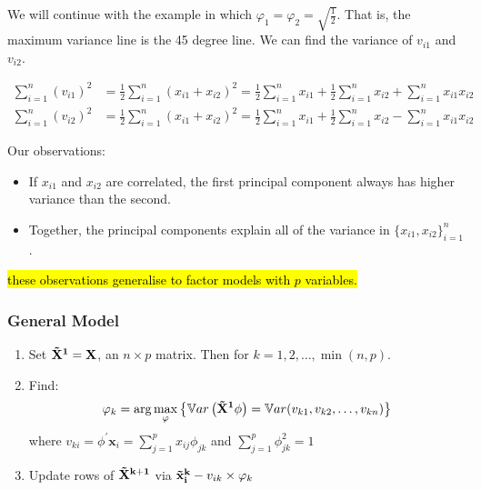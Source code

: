 \documentclass[11pt]{article}
\begin{document}
We will continue with the example in which $\varphi_1 = \varphi_2 = \sqrt{\frac{1}{2}}$. That is, the maximum variance line is the 45 degree line. We can find the variance of $v_{i1}$ and $v_{i2}$.

\begin{align*}
    \sum_{i=1}^n (v_{i1})^2 &= \frac{1}{2}\sum_{i=1}^n(x_{i1} + x_{i2})^2 = \frac{1}{2}\sum_{i=1}^n x_{i1} + \frac{1}{2}\sum_{i=1}^n x_{i2} + \sum_{i=1}^n x_{i1} x_{i2} \\
    \sum_{i=1}^n (v_{i2})^2 &= \frac{1}{2}\sum_{i=1}^n(x_{i1} + x_{i2})^2 = \frac{1}{2}\sum_{i=1}^n x_{i1} + \frac{1}{2}\sum_{i=1}^n x_{i2} - \sum_{i=1}^n x_{i1} x_{i2}
\end{align*}

\begin{shaded}
    Our observations:
    \begin{itemize}
        \item If $x_{i1}$ and $x_{i2}$ are correlated, the first principal component always has higher variance than the second.

        \item Together, the principal components explain all of the variance in $\{x_{i1}, x_{i2}\}_{i=1}^n$.
    \end{itemize}

    \hl{these observations generalise to factor models with $p$ variables.}
    
\end{shaded}

\subsubsection{General Model}

\begin{algo}

\begin{enumerate}
\hspace{1in}
    \item Set $\mathbf{\Tilde{X}^1 = X}$, an $n \times p$ matrix. Then for $k = 1, 2, \ldots, \min(n,p)$. 
    \item Find:
    \begin{equation}
        \varphi_k = \arg\underset{\varphi}{\max}\left\{\mathbb{V}ar\left(\mathbf{\Tilde{X}^1}\phi\right) = \mathbb{V}ar(v_{k1}, v_{k2}, \ldots, v_{kn})\right\}
    \end{equation}
    where $v_{ki} = \phi^\prime \mathbf{x}_i = \sum_{j=1}^px_{ij}\phi_{jk}$ and $\sum_{j=1}^p \phi_{jk}^2 = 1$
    \item Update rows of $\mathbf{\Tilde{X}^{k+1}}$ via $\mathbf{\Tilde{x}_i^k} - v_{ik} \times \varphi_k$
\end{enumerate}

\end{algo}
\end{document}
